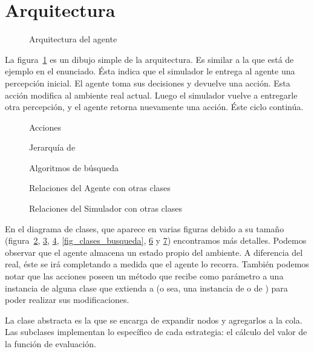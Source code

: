 \section{Arquitectura}

\begin{figure}[h]
\caption{Arquitectura del agente}
\label{fig:arquitectura}
\end{figure}

La figura~\ref{fig:arquitectura} es un dibujo simple de la arquitectura. Es
similar a la que está de ejemplo en el enunciado. Ésta indica que el simulador
le entrega al agente una percepción inicial. El agente toma sus decisiones y
devuelve una acción. Esta acción modifica al ambiente real actual. Luego el
simulador vuelve a entregarle otra percepción, y el agente retorna nuevamente
una acción. Éste ciclo continúa.

\begin{figure}
\caption{}
\label{fig:clases_agente}
\end{figure}

\begin{figure}
\caption{Acciones}
\label{fig:clases_acciones}
\end{figure}

\begin{figure}
\caption{Jerarquía de }
\label{fig:clases_ambiente}
\end{figure}

\begin{figure}
\caption{Algoritmos de búsqueda}
\label{fig:clases_busqueda}
\end{figure}

\begin{figure}
\caption{Relaciones del Agente con otras clases}
\label{fig:clases_relaciones_agente}
\end{figure}

\begin{figure}
\caption{Relaciones del Simulador con otras clases}
\label{fig:clases_relaciones_simulador}
\end{figure}

En el diagrama de clases, que aparece en varias figuras debido a su tamaño
(figura~\ref{fig:clases_agente}, \ref{fig:clases_acciones},
\ref{fig:clases_ambiente}, \ref{fig_clases_busqueda},
\ref{fig:clases_relaciones_agente} y \ref{fig:clases_relaciones_simulador})
encontramos más detalles. Podemos observar que el agente almacena un estado
propio del ambiente. A diferencia del real, éste se irá completando a medida
que el agente lo recorra. También podemos notar que las acciones poseen un
método  que recibe como parámetro a una instancia de alguna
clase que extienda a  (o sea, una instancia de
 o de ) para poder realizar sus
modificaciones.

La clase abstracta  es la que se encarga de expandir nodos y
agregarlos a la cola. Las subclases implementan lo específico de cada
estrategia: el cálculo del valor de la función de evaluación.

